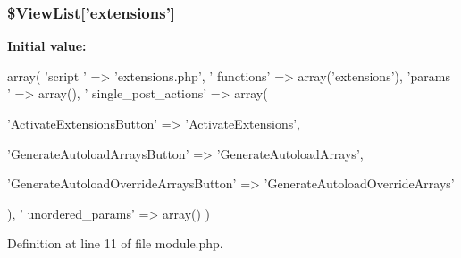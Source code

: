 \hypertarget{module_8php_a0cfec2359ce3a2faffb2a415c2bcbd21}{
\subsubsection[{\$\-View\-List}]{\setlength{\rightskip}{0pt plus 5cm}\$\-View\-List\mbox{[}'extensions'\mbox{]}}}\label{module_8php_a0cfec2359ce3a2faffb2a415c2bcbd21}
{\bfseries \-Initial value\-:}
\begin{DoxyCode}
 array(
                                                                        'script
      ' => 'extensions.php',
                                                                        '
      functions' => array('extensions'),
                                                                        'params
      ' => array(),
                                                                        '
      single_post_actions' => array( 
                                                                                                                
      'ActivateExtensionsButton' => 'ActivateExtensions',
                                                                                                                
      'GenerateAutoloadArraysButton' => 'GenerateAutoloadArrays',
                                                                                                                
      'GenerateAutoloadOverrideArraysButton' => 'GenerateAutoloadOverrideArrays'
                                                                                        
      ),
                                                                        '
      unordered_params' => array()
)
\end{DoxyCode}


\-Definition at line 11 of file module.\-php.

